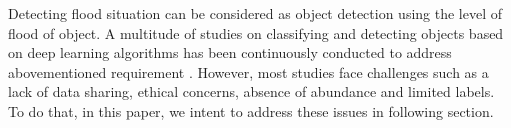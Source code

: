 Detecting flood situation can be considered as object detection using the level of flood of object. A multitude of studies on classifying and detecting objects based on deep learning algorithms has been continuously conducted to address abovementioned requirement  \cite{floodlo2021deep, floodpally2022application, floodkaranjit2023floodimg, floodzhong2024detection, floodwu2024identification}. However, most studies face challenges such as a lack of data sharing, ethical concerns, absence of abundance and limited labels. To do that, in this paper, we intent to address these issues in following section.